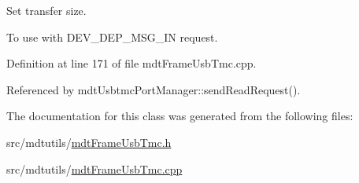 Set transfer size. 

To use with D\-E\-V\-\_\-\-D\-E\-P\-\_\-\-M\-S\-G\-\_\-\-I\-N request. 

Definition at line 171 of file mdt\-Frame\-Usb\-Tmc.\-cpp.



Referenced by mdt\-Usbtmc\-Port\-Manager\-::send\-Read\-Request().



The documentation for this class was generated from the following files\-:\begin{DoxyCompactItemize}
\item 
src/mdtutils/\hyperlink{mdt_frame_usb_tmc_8h}{mdt\-Frame\-Usb\-Tmc.\-h}\item 
src/mdtutils/\hyperlink{mdt_frame_usb_tmc_8cpp}{mdt\-Frame\-Usb\-Tmc.\-cpp}\end{DoxyCompactItemize}
